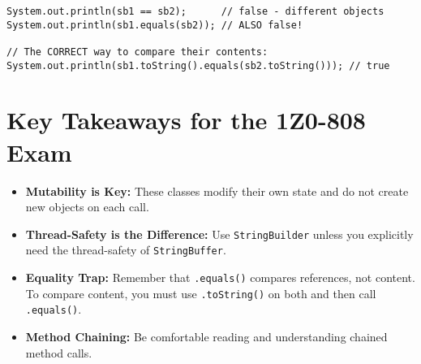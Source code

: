 \documentclass[12pt]{article}
\begin{document}
\begin{enumerate}[label=(\arabic*)]
\begin{verbatim}
System.out.println(sb1 == sb2);      // false - different objects
System.out.println(sb1.equals(sb2)); // ALSO false! 

// The CORRECT way to compare their contents:
System.out.println(sb1.toString().equals(sb2.toString())); // true
\end{verbatim}

\section{Key Takeaways for the 1Z0-808 Exam}
\begin{itemize}
    \item \textbf{Mutability is Key:} These classes modify their own state and do not create new objects on each call.
    \item \textbf{Thread-Safety is the Difference:} Use \texttt{StringBuilder} unless you explicitly need the thread-safety of \texttt{StringBuffer}.
    \item \textbf{Equality Trap:} Remember that \texttt{.equals()} compares references, not content. To compare content, you must use \texttt{.toString()} on both and then call \texttt{.equals()}.
    \item \textbf{Method Chaining:} Be comfortable reading and understanding chained method calls.
\end{itemize}
\end{enumerate}
\end{document}
